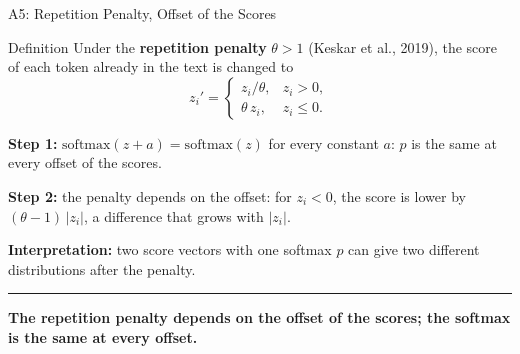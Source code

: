 \documentclass[8pt,aspectratio=169]{beamer}
\newcommand{\bottomnote}[1]{%
\vfill\vspace{-2mm}
\textcolor{mllavender2}{\rule{\textwidth}{0.4pt}}
\vspace{1mm}\footnotesize\textbf{#1}}
\begin{document}
\begin{frame}[t]{A5: Repetition Penalty, Offset of the Scores}
\begin{block}{Definition}
Under the \textbf{repetition penalty} $\theta > 1$ (Keskar et al., 2019), the score of each token already in the text is changed to
\[ z_i' = \begin{cases} z_i / \theta, & z_i > 0, \\ \theta\, z_i, & z_i \le 0. \end{cases} \]
\end{block}

\vspace{2mm}
\textbf{Step 1:} $\mathrm{softmax}(z + a) = \mathrm{softmax}(z)$ for every constant $a$: $p$ is the same at every offset of the scores.

\vspace{2mm}
\textbf{Step 2:} the penalty depends on the offset: for $z_i < 0$, the score is lower by $(\theta - 1)\,|z_i|$, a difference that grows with $|z_i|$.

\vspace{2mm}
\textbf{Interpretation:} two score vectors with one softmax $p$ can give two different distributions after the penalty.

\bottomnote{The repetition penalty depends on the offset of the scores; the softmax is the same at every offset.}
\end{frame}
\end{document}
